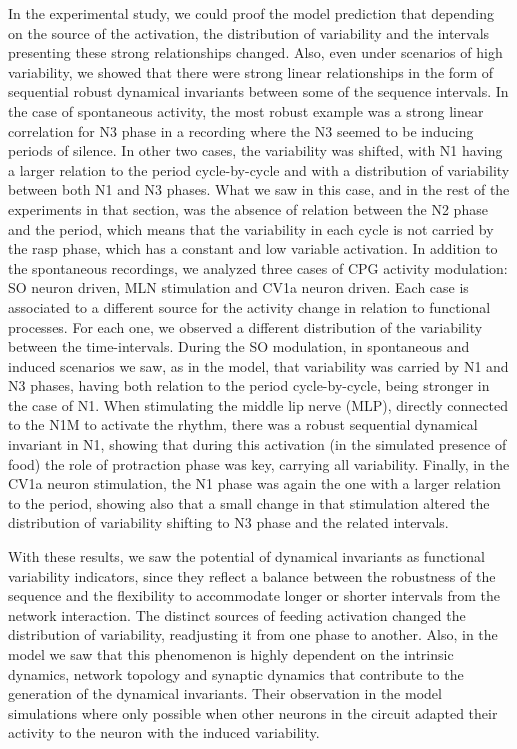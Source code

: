 In the experimental study, we could proof the model prediction that depending on the source of the activation, the distribution of variability and the intervals presenting these strong relationships changed. Also, even under scenarios of high variability, we showed that there were strong linear relationships in the form of sequential robust dynamical invariants between some of the sequence intervals. In the case of spontaneous activity, the most robust example was a strong linear correlation for N3 phase in a recording where the N3 seemed to be inducing periods of silence. In other two cases, the variability was shifted, with N1 having a larger relation to the period cycle-by-cycle and with a distribution of variability between both N1 and N3 phases. What we saw in this case, and in the rest of the experiments in that section, was the absence of relation between the N2 phase and the period, which means that the variability in each cycle is not carried by the rasp phase, which has a constant and low variable activation. In addition to the spontaneous recordings, we analyzed three cases of CPG activity modulation: SO neuron driven, MLN stimulation and CV1a neuron driven. Each case is associated to a different source for the activity change in relation to functional processes. For each one, we observed a different distribution of the variability between the time-intervals. During the SO modulation, in spontaneous and induced scenarios we saw, as in the model, that variability was carried by N1 and N3 phases, having both relation to the period cycle-by-cycle, being stronger in the case of N1. When stimulating the middle lip nerve (MLP), directly connected to the N1M to activate the rhythm, there was a robust sequential dynamical invariant in N1, showing that during this activation (in the simulated presence of food) the role of protraction phase was key, carrying all variability. Finally, in the CV1a neuron stimulation, the N1 phase was again the one with a larger relation to the period, showing also that a small change in that stimulation altered the distribution of variability shifting to N3 phase and the related intervals. 

With these results, we saw the potential of dynamical invariants as functional variability indicators, since they reflect a balance between the robustness of the sequence and the flexibility to accommodate longer or shorter intervals from the network interaction. The distinct sources of feeding activation changed the distribution of variability, readjusting it from one phase to another. Also, in the model we saw that this phenomenon is highly dependent on the intrinsic dynamics, network topology and synaptic dynamics that contribute to the generation of the dynamical invariants. Their observation in the model simulations where only possible when other neurons in the circuit adapted their activity to the neuron with the induced variability. 

